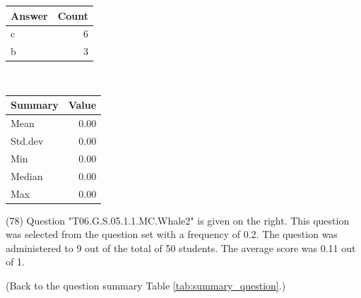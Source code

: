 \documentclass[12pt,english,nohyper]{tufte-handout}\usepackage[]{graphicx}\usepackage[]{color}
\begin{document}
\begin{center}%
\begin{tabular}{lr}
  \hline
Answer & Count \\ 
  \hline
c &   6 \\ 
  b &   3 \\ 
   \hline
\end{tabular}
~~~~~~~~%
\begin{tabular}{lr}
  \hline
Summary & Value \\ 
  \hline
Mean & 0.00 \\ 
  Std.dev & 0.00 \\ 
  Min & 0.00 \\ 
  Median & 0.00 \\ 
  Max & 0.00 \\ 
   \hline
\end{tabular}
\end{center}\newpage{} (78) Question "T06.G.S.05.1.1.MC.Whale2" is given on the right. This question was selected from the question set with a frequency of 0.2. The question was administered to 9 out of the total of 50 students. The average score was 0.11 out of 1.

 (Back to the question summary Table \ref{tab:summary_question}.)
\end{document}
